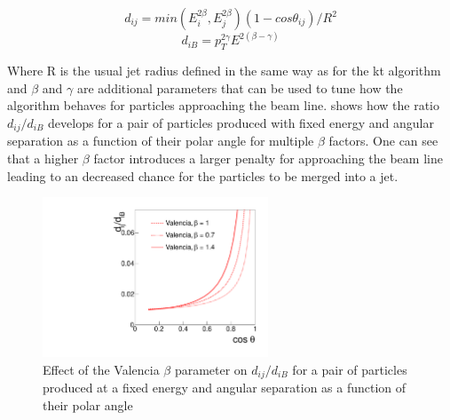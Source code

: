 \begin{equation}
d_{ij}=min(E_i^{2\beta},E_j^{2\beta})(1-cos\theta_{ij})/R^2
\end{equation}
\begin{equation}
d_{iB}=p_T^{2\gamma}E^{2(\beta - \gamma)}
\end{equation}

Where R is the usual jet radius defined in the same way as for the kt algorithm and $\beta$ and $\gamma$ are additional parameters that can be used to tune how the algorithm behaves for particles approaching the beam line.  shows how the ratio $d_{ij}/d_{iB}$ develops for a pair of particles produced with fixed energy and angular separation as a function of their polar angle for multiple $\beta$ factors. One can see that a higher $\beta$ factor introduces a larger penalty for approaching the beam line leading to an decreased chance for the particles to be merged into a jet.

\begin{figure}
  \centering
  \includegraphics[width=0.6\textwidth]{TopAnalysis/figures/distance_ratio_vlc.pdf}
  \caption[Effect of the Valencia $\beta$ parameter]{Effect of the Valencia $\beta$ parameter on $d_{ij}/d_{iB}$ for a pair of particles produced at a fixed energy and angular separation as a function of their polar angle\cite{Boronat:2014hva}}
  \label{fig:valenciaPerformance}
\end{figure}

